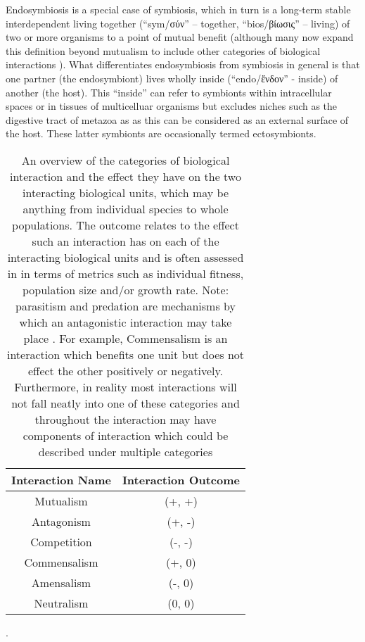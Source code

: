 Endosymbiosis is a special case of symbiosis, which in turn is a long-term stable interdependent 
living together (``sym/σύν'' -- together, ``bios/βίωσις'' -- living) of two or more 
organisms to a point of mutual benefit \citep{DeBary1869,Pound1893} (although many now expand %
this definition beyond mutualism to include other categories of biological interactions \citep{Leung2008,OMalley2015}).
What differentiates endosymbiosis from symbiosis in general is that one partner (the endosymbiont) lives wholly
inside (``endo/ἔνδον'' - inside) of another (the host). This ``inside'' can refer to symbionts within intracellular
spaces or in tissues of multicelluar organisms but excludes niches such as the digestive tract of metazoa as 
as this can be considered as an external surface of the host. These latter symbionts are occasionally termed ectosymbionts.
\begin{table}[h]
    \begin{tabular}{@{}cc@{}}
        \toprule
        \multicolumn{1}{r}{\textbf{Interaction Name}} & \multicolumn{1}{l}{\textbf{Interaction Outcome}} \\ 
        \midrule
        \multicolumn{1}{|c|}{Mutualism}               & \multicolumn{1}{c|}{(+, +)}                      \\
        \multicolumn{1}{|c|}{Antagonism}              & \multicolumn{1}{c|}{(+, -)}                      \\
        \multicolumn{1}{|c|}{Competition}             & \multicolumn{1}{c|}{(-, -)}                      \\
        \multicolumn{1}{|c|}{Commensalism}            & \multicolumn{1}{c|}{(+, 0)}                      \\
        \multicolumn{1}{|c|}{Amensalism}              & \multicolumn{1}{c|}{(-, 0)}                      \\
        \multicolumn{1}{|c|}{Neutralism}              & \multicolumn{1}{c|}{(0, 0)}                      \\ 
        \bottomrule
    \end{tabular}
    \caption{An overview of the categories of biological interaction and the effect they have on the two interacting
        biological units, which may be anything from individual species to whole populations. The outcome relates to the effect
        such an interaction has on each of the interacting biological units and is often assessed in in terms of metrics such as 
        individual fitness, population size and/or growth rate.  
        Note: parasitism and predation are mechanisms by which an antagonistic interaction may take place \citep{Abrams1987}.
        For example, Commensalism is an interaction which benefits one unit but does not effect the other positively or
        negatively.
        Furthermore, in reality most interactions will not fall neatly into one of these categories and throughout the interaction
    may have components of interaction which could be described under multiple categories \citep{Leung2008}}. 
    \label{table:biointeractions}
\end{table}

